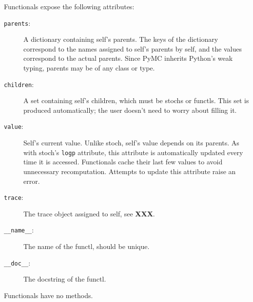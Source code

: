 \documentclass[]{book}
\begin{document}
Functionals expose the following attributes:
\begin{description}
    \item[\texttt{parents}:] A dictionary containing self's parents. The keys of the dictionary correspond to the names assigned to self's parents by self, and the values correspond to the actual parents. Since PyMC inherits Python's weak typing, parents may be of any class or type.
    \item[\texttt{children}:] A set containing self's children, which must be stochs or functls. This set is produced automatically; the user doesn't need to worry about filling it.
    \item[\texttt{value}:] Self's current value. Unlike stoch, self's value depends on its parents. As with stoch's \texttt{logp} attribute, this attribute is automatically updated every time it is accessed. Functionals cache their last few values to avoid unnecessary recomputation. Attempts to update this attribute raise an error.
    \item[\texttt{trace}:] The trace object assigned to self, see \textbf{XXX}.
    \item[\texttt{\_\_name\_\_}:] The name of the functl, should be unique.
    \item[\texttt{\_\_doc\_\_}:] The docstring of the functl.
\end{description}
Functionals have no methods.
\end{document}
